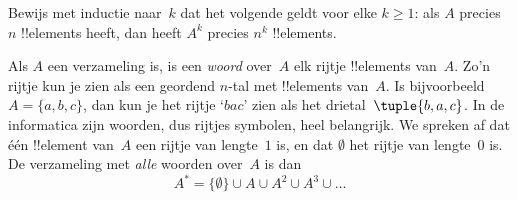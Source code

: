 \documentclass[../../../include/open-logic-section]{subfiles}
\begin{document}
\begin{prob}
Bewijs met inductie naar~$k$ dat het volgende geldt voor elke $k \ge
1$: als $A$ precies $n$ !!{element}s heeft, dan heeft $A^k$ precies
$n^k$ !!{element}s.
\end{prob}

\begin{ex}
Als $A$ een verzameling is, is een \emph{woord} over~$A$ elk rijtje
!!{element}s van~$A$. Zo'n rijtje kun je zien als een geordend $n$-tal met
!!{element}s van~$A$. Is bijvoorbeeld $A = \{a, b, c\}$, dan kun je
het rijtje ‘$bac$’ zien als het drietal~$\tuple{b, a, c}$. In de
informatica zijn woorden, dus rijtjes symbolen, heel belangrijk. We
spreken af dat één !!{element} van~$A$ een rijtje van lengte~$1$ is,
en dat $\emptyset$ het rijtje van lengte~$0$ is. De verzameling met
\emph{alle} woorden over~$A$ is dan
\[
A^* = \{\emptyset\} \cup A \cup A^2 \cup A^3 \cup \dots
\]
\end{ex}
\end{document}
